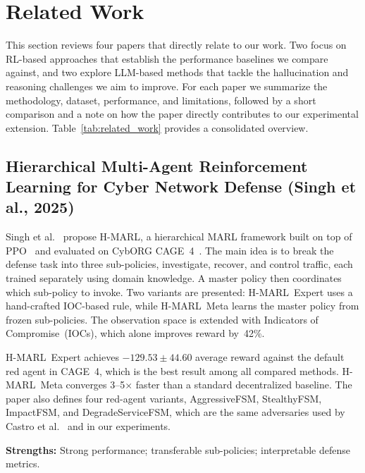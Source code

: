 \documentclass[letterpaper, 10 pt, conference]{ieeeconf}
\begin{document}

\section{Related Work}
 
This section reviews four papers that directly relate to our
work. Two focus on RL-based approaches that establish the
performance baselines we compare against, and two explore
LLM-based methods that tackle the hallucination and reasoning
challenges we aim to improve. For each paper we summarize
the methodology, dataset, performance, and limitations,
followed by a short comparison and a note on how the paper
directly contributes to our experimental extension.
Table~\ref{tab:related_work} provides a consolidated overview.
 
\subsection{\textbf{Hierarchical Multi-Agent Reinforcement Learning
            for Cyber Network Defense (Singh et al., 2025)}}
 
Singh et al.~\cite{arXiv:2410.17351} propose H-MARL, a
hierarchical MARL framework built on top of PPO~\cite{arXiv:1707.06347}
and evaluated on CybORG CAGE~4~\cite{CAGE4:2023}. The main
idea is to break the defense task into three sub-policies,
investigate, recover, and control traffic, each trained
separately using domain knowledge. A master policy then
coordinates which sub-policy to invoke. Two variants are
presented: H-MARL~Expert uses a hand-crafted IOC-based rule,
while H-MARL~Meta learns the master policy from frozen
sub-policies. The observation space is extended with Indicators
of Compromise~(IOCs), which alone improves reward by~42\%.
 
H-MARL~Expert achieves $-129.53 \pm 44.60$ average reward
against the default red agent in CAGE~4, which is the best
result among all compared methods. H-MARL~Meta converges
3--5$\times$ faster than a standard decentralized baseline.
The paper also defines four red-agent variants,
AggressiveFSM, StealthyFSM, ImpactFSM, and
DegradeServiceFSM, which are the same adversaries used
by Castro et al.~\cite{arXiv:2505.04843v2} and in our
experiments.
 
\textbf{Strengths:} Strong performance; transferable
sub-policies; interpretable defense metrics.
 
\end{document}
